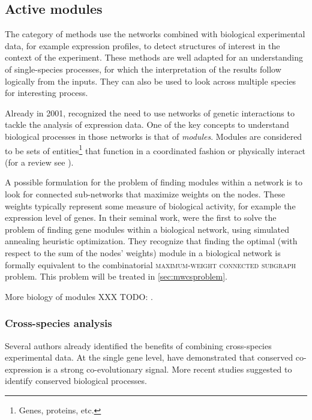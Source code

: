 \subsection{Active modules}
\label{subsec:activemodules}

	The category of methods use the networks combined with biological experimental data, for example expression profiles, to detect structures of interest in the context of the experiment.
	These methods are well adapted for an understanding of single-species processes, for which the interpretation of the results follow logically from the inputs.
	They can also be used to look across multiple species for interesting process.

	Already in 2001, \textcite{altman2001whole} recognized the need to use networks of genetic interactions to tackle the analysis of expression data.
	One of the key concepts to understand biological processes in those networks is that of \emph{modules}.
	Modules are considered to be sets of entities\footnote{Genes, proteins, etc.} that function in a coordinated fashion or physically interact (for a review see \textcite{mitra2013integrative}).


	A possible formulation for the problem of finding modules within a network is to look for connected sub-networks that maximize weights on the nodes.
	These weights typically represent some measure of biological activity, for example the expression level of genes.
	In their seminal work, \textcite{ideker2002discovering} were the first to solve the problem of finding gene modules within a biological network, using simulated annealing heuristic optimization.
	They recognize that finding the optimal (with respect to the sum of the nodes' weights) module in a biological network is formally equivalent to the combinatorial \textsc{maximum-weight connected subgraph} problem.
	This problem will be treated in \cref{sec:mwcsproblem}.

	More biology of modules XXX TODO: \parencites{dittrich2008identifying}{yamamoto2009better}{backes2012integer}{mitra2013integrative}.


\subsubsection{Cross-species analysis}

	Several authors already identified the benefits of combining cross-species experimental data.
	At the single gene level, \textcite{noort2003predicting} have demonstrated that conserved co-expression is a strong co-evolutionary signal.
	More recent studies suggested to identify conserved biological processes.

